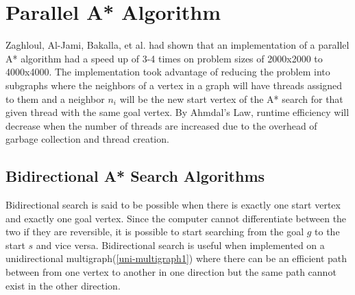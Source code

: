 

\section{Parallel A* Algorithm}
Zaghloul, Al-Jami, Bakalla, et al. had shown that an implementation of a parallel A* algorithm 
had a speed up of 3-4 times on problem sizes of 2000x2000 to 4000x4000.\cite{ZaghloulAlJami2017}
The implementation took advantage of reducing the problem into subgraphs where the neighbors of a
vertex in a graph will have threads assigned to them and a neighbor $n_i$ will be the new start 
vertex of the A* search for that given thread with the same goal vertex. By Ahmdal's Law, 
runtime efficiency will decrease when the number of threads are increased due to the overhead 
of garbage collection and thread creation. 

\subsection{Bidirectional A* Search Algorithms}
Bidirectional search is said to be possible when there is exactly one start vertex and exactly one goal vertex.
Since the computer cannot differentiate between the two if they are reversible, it is possible to start 
searching from the goal $g$ to the start $s$ and vice versa.\cite{KainlKainz1997} Bidirectional search 
is useful when implemented on a unidirectional multigraph(\ref{uni-multigraph1})
where there can be an efficient path between from 
one vertex to another in one direction but the same path cannot exist in the other direction.

